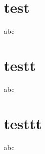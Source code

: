 \documentclass{beamer}
\begin{document}
\section{test}
\begin{frame}
    abc
\end{frame} 

\section{testt}
\begin{frame}
    abc
\end{frame} 

\section{testtt}
\begin{frame}
    abc
\end{frame} 
\end{document}
